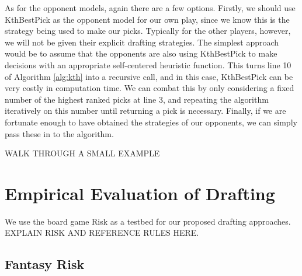 \documentclass[letterpaper]{article}
\numberwithin{equation}{section}
\numberwithin{theorem}{section}
\numberwithin{lemma}{section}
\numberwithin{df}{section}
\begin{document}
As for the opponent models, again there are a few options.  Firstly, we should use KthBestPick as the opponent model for our own play, since we know this is the strategy being used to make our picks.  Typically for the other players, however, we will not be given their explicit drafting strategies.  The simplest approach would be to assume that the opponents are also using KthBestPick to make decisions with an appropriate self-centered heuristic function.  This turns line 10 of Algorithm \ref{alg:kth} into a recursive call, and in this case, KthBestPick can be very costly in computation time.  We can combat this by only considering a fixed number of the highest ranked picks at line 3, and repeating the algorithm iteratively on this number until returning a pick is necessary.  Finally, if we are fortunate enough to have obtained the strategies of our opponents, we can simply pass these in to the algorithm.

WALK THROUGH A SMALL EXAMPLE

%

\section{Empirical Evaluation of Drafting}

We use the board game Risk as a testbed for our proposed drafting approaches.  EXPLAIN RISK AND REFERENCE RULES HERE.

\subsection{Fantasy Risk}
\end{document}
